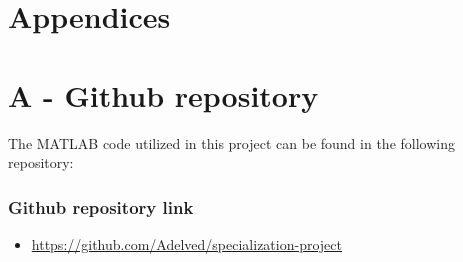 \chapter*{\LARGE \textbf{Appendices}}
\fancyhf{} %
\renewcommand{\headrulewidth}{0pt} %
\fancyfoot[C]{\thepage} %

\appendix


\chapter*{A - Github repository}

The MATLAB code utilized in this project can be found in the following repository:

\subsection*{Github repository link}
\begin{itemize}
    \item \url{https://github.com/Adelved/specialization-project}
\end{itemize}



